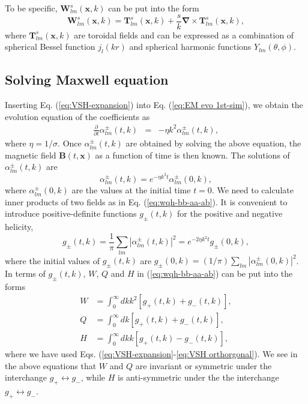 \documentclass[english,aps,superscriptaddress,preprint]{revtex4-1}
\begin{document}
To be specific, $\boldsymbol{W}_{lm}^{s}(\boldsymbol{x},k)$ can be
put into the form 
\begin{equation}
\boldsymbol{W}_{lm}^{s}(\boldsymbol{x},k)=\boldsymbol{T}_{lm}^{s}(\boldsymbol{x},k)+\frac{s}{k}\boldsymbol{\nabla}\times\boldsymbol{T}_{lm}^{s}(\boldsymbol{x},k),
\end{equation}
where $\boldsymbol{T}_{lm}^{s}(\boldsymbol{x},k)$ are toroidal fields
and can be expressed as a combination of spherical Bessel function
$j_{l}(kr)$ and spherical harmonic functions $Y_{lm}\left(\theta,\phi\right)$.

\subsection{Solving Maxwell equation}

Inserting Eq. (\ref{eq:VSH-expansion}) into Eq. (\ref{eq:EM evo 1st-sim}),
we obtain the evolution equation of the coefficients as 
\begin{eqnarray}
\frac{\partial}{\partial t}\alpha_{lm}^{\pm}(t,k) & = & -\eta k^{2}\alpha_{lm}^{\pm}(t,k),\label{eq:coe alpha equ}
\end{eqnarray}
where $\eta=1/\sigma$. Once $\alpha_{lm}^{\pm}(t,k)$ are obtained
by solving the above equation, the magnetic field $\boldsymbol{B}\left(t,\boldsymbol{x}\right)$
as a function of time is then known. The solutions of $\alpha_{lm}^{\pm}(t,k)$
are 
\begin{equation}
\alpha_{lm}^{\pm}(t,k)=e^{-\eta k^{2}t}\alpha_{lm}^{\pm}(0,k),
\end{equation}
where $\alpha_{lm}^{\pm}(0,k)$ are the values at the initial time
$t=0$. We need to calculate inner products of two fields as in Eq.
(\ref{eq:wqh-bb-aa-ab}). It is convenient to introduce positive-definite
functions $g_{\pm}(t,k)$ for the positive and negative helicity,
\begin{equation}
g_{\pm}(t,k)=\frac{1}{\pi}\sum_{lm}\left|\alpha_{lm}^{\pm}(t,k)\right|^{2}=e^{-2\eta k^{2}t}g_{\pm}(0,k),\label{eq:sol-g}
\end{equation}
where the initial values of $g_{\pm}(t,k)$ are $g_{\pm}(0,k)=(1/\pi)\sum_{lm}\left|\alpha_{lm}^{\pm}(0,k)\right|^{2}$.
In terms of $g_{\pm}(t,k)$, $W$, $Q$ and $H$ in (\ref{eq:wqh-bb-aa-ab})
can be put into the forms 
\begin{align}
W & =\int_{0}^{\infty}dkk^{2}\left[g_{+}(t,k)+g_{-}(t,k)\right],\nonumber \\
Q & =\int_{0}^{\infty}dk\left[g_{+}(t,k)+g_{-}(t,k)\right],\nonumber \\
H & =\int_{0}^{\infty}dkk\left[g_{+}(t,k)-g_{-}(t,k)\right],\label{eq:vsh-expand-wqh}
\end{align}
where we have used Eqs. (\ref{eq:VSH-expansion}-\ref{eq:VSH orthorgonal}).
We see in the above equations that $W$ and $Q$ are invariant or
symmetric under the interchange $g_{+}\leftrightarrow g_{-}$, while
$H$ is anti-symmetric under the the interchange $g_{+}\leftrightarrow g_{-}$.
\end{document}
